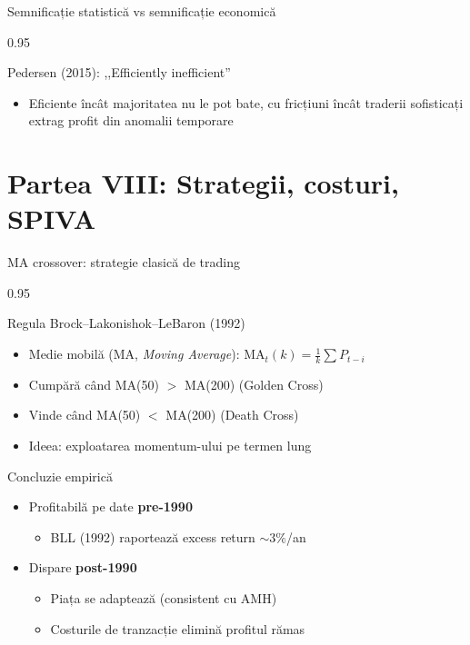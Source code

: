 \documentclass[9pt, aspectratio=169, t]{beamer}
\begin{document}
\begin{frame}[shrink=15]{Semnificație statistică vs semnificație economică}
\begin{cminipage}{0.95\textwidth}
\vspace{0.05cm}
\begin{alertblock}{Pedersen (2015): ,,Efficiently inefficient''}
\footnotesize
\begin{itemize}\setlength{\itemsep}{0pt}
    \item Eficiente încât majoritatea nu le pot bate, cu fricțiuni încât traderii sofisticați extrag profit din anomalii temporare
\end{itemize}
\end{alertblock}
\end{cminipage}
\end{frame}

\section{Partea VIII: Strategii, costuri, SPIVA}

\begin{frame}[shrink=15]{MA crossover: strategie clasică de trading}
\begin{cminipage}{0.95\textwidth}
\begin{block}{Regula Brock--Lakonishok--LeBaron (1992)}
\begin{itemize}\setlength{\itemsep}{0pt}
    \item Medie mobilă (MA, \textit{Moving Average}): $\text{MA}_t(k) = \frac{1}{k}\sum P_{t-i}$
    \item Cumpără când MA(50) $>$ MA(200) (Golden Cross)
    \item Vinde când MA(50) $<$ MA(200) (Death Cross)
    \item Ideea: exploatarea momentum-ului pe termen lung
\end{itemize}
\end{block}

\begin{alertblock}{Concluzie empirică}
\begin{itemize}\setlength{\itemsep}{0pt}
    \item Profitabilă pe date \textbf{pre-1990}
    \begin{itemize}\setlength{\itemsep}{0pt}
        \item BLL (1992) raportează excess return $\sim 3\%$/an
    \end{itemize}
    \item Dispare \textbf{post-1990}
    \begin{itemize}\setlength{\itemsep}{0pt}
        \item Piața se adaptează (consistent cu AMH)
        \item Costurile de tranzacție elimină profitul rămas
    \end{itemize}
\end{itemize}
\end{alertblock}
\end{cminipage}
\end{frame}
\end{document}

